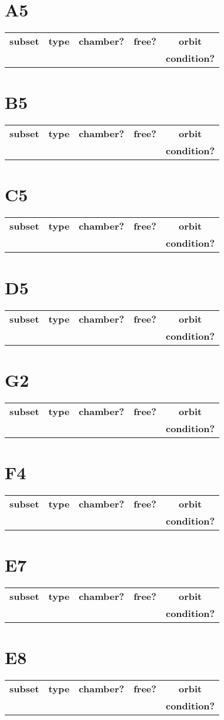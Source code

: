 \documentclass{article}
\newcommand{\resulttable}[1]{
  \section*{#1}
\begin{longtable}{llccc}
  \toprule
  \textbf{subset} & \textbf{type} & \textbf{chamber?} & \textbf{free?} & \textbf{orbit} \\
                  &               &                   &                & \textbf{condition?} \\
  \midrule
  
  \bottomrule
\end{longtable}
}
\begin{document}
\resulttable{A5}\newpage
\resulttable{B5}\newpage
\resulttable{C5}\newpage
\resulttable{D5}\newpage
\resulttable{G2}
\resulttable{F4}\newpage
\resulttable{E7}\newpage
\resulttable{E8}
\end{document}
